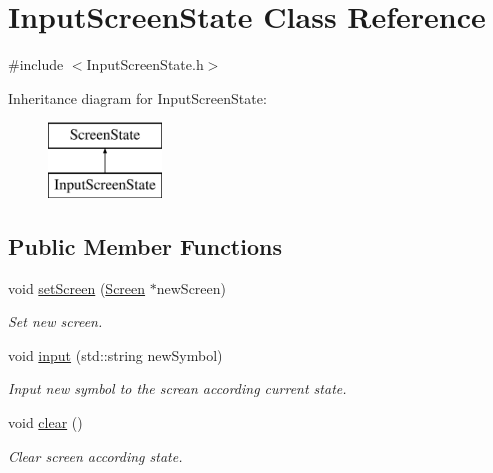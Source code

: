\hypertarget{class_input_screen_state}{}\section{Input\+Screen\+State Class Reference}
\label{class_input_screen_state}


{\ttfamily \#include $<$Input\+Screen\+State.\+h$>$}

Inheritance diagram for Input\+Screen\+State\+:\begin{figure}[H]
\begin{center}
\leavevmode
\includegraphics[height=2.000000cm]{class_input_screen_state}
\end{center}
\end{figure}
\subsection*{Public Member Functions}
\begin{DoxyCompactItemize}
\item 
void \hyperlink{class_input_screen_state_acc41e5841cd19d4a55603793b6fb8180}{set\+Screen} (\hyperlink{class_screen}{Screen} $\ast$new\+Screen)
\begin{DoxyCompactList}\small\item\em Set new screen. \end{DoxyCompactList}\item 
void \hyperlink{class_input_screen_state_a2189d602f5fe02660488a5a49c4c76f8}{input} (std\+::string new\+Symbol)
\begin{DoxyCompactList}\small\item\em Input new symbol to the screan according current state. \end{DoxyCompactList}\item 
\hypertarget{class_input_screen_state_a1c2b747f0aa827cc5d60c56c154d4573}{}void \hyperlink{class_input_screen_state_a1c2b747f0aa827cc5d60c56c154d4573}{clear} ()\label{class_input_screen_state_a1c2b747f0aa827cc5d60c56c154d4573}

\begin{DoxyCompactList}\small\item\em Clear screen according state. \end{DoxyCompactList}\end{DoxyCompactItemize}
